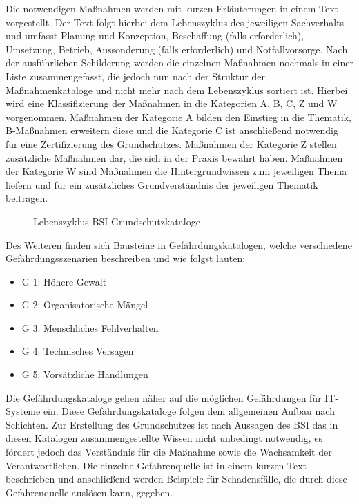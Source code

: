	Die notwendigen Maßnahmen werden mit kurzen Erläuterungen in einem Text vorgestellt. 
	Der Text folgt hierbei dem Lebenszyklus des jeweiligen Sachverhalts und umfasst 
	Planung und Konzeption, Beschaffung (falls erforderlich), Umsetzung, Betrieb, 
	Aussonderung (falls erforderlich) und Notfallvorsorge. 
	Nach der ausführlichen Schilderung werden die einzelnen Maßnahmen nochmals in einer Liste zusammengefasst, 
	die jedoch nun nach der Struktur der Maßnahmenkataloge und nicht mehr nach dem Lebenszyklus sortiert ist. 
	Hierbei wird eine Klassifizierung der Maßnahmen in die Kategorien A, B, C, Z und W vorgenommen. 
	Maßnahmen der Kategorie A bilden den Einstieg in die Thematik, B-Maßnahmen erweitern diese und die Kategorie C ist 
	anschließend notwendig für eine Zertifizierung des Grundschutzes. 
	Maßnahmen der Kategorie Z stellen zusätzliche Maßnahmen dar, die sich in der Praxis bewährt haben. 
	Maßnahmen der Kategorie W sind Maßnahmen die Hintergrundwissen zum jeweiligen Thema liefern 
	und für ein zusätzliches Grundverständnis der jeweiligen Thematik beitragen.
	
	\begin{figure}[htbp]
		\centering
		\caption[Lebenszyklus-BSI-Grundschutzkataloge]{Lebenszyklus-BSI-Grundschutzkataloge}
		\label{Lebenszyklus-BSI-Grundschutzkataloge}
	\end{figure}
	\pagebreak
 	
 	Des Weiteren finden sich Bausteine in Gefährdungskatalogen, welche verschiedene Gefährdungsszenarien 
 	beschreiben und wie folgst lauten:
 	
 	\begin{itemize}
 		\item G 1: Höhere Gewalt
 		\item G 2: Organisatorische Mängel
 		\item G 3: Menschliches Fehlverhalten
 		\item G 4: Technisches Versagen
 		\item G 5: Vorsätzliche Handlungen
 	\end{itemize}
 	Die Gefährdungskataloge gehen näher auf die möglichen Gefährdungen für IT-Systeme ein.
 	Diese Gefährdungskataloge folgen dem allgemeinen Aufbau nach Schichten.
 	Zur Erstellung des Grundschutzes ist nach Aussagen des BSI das in diesen Katalogen 
 	zusammengestellte Wissen nicht unbedingt notwendig, es fördert jedoch das Verständnis 
 	für die Maßnahme sowie die Wachsamkeit der Verantwortlichen. Die einzelne Gefahrenquelle 
 	ist in einem kurzen Text beschrieben und anschließend werden Beispiele für Schadensfälle, 
 	die durch diese Gefahrenquelle auslösen kann, gegeben.
 	

